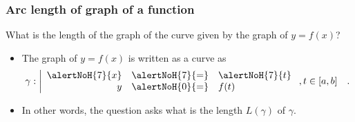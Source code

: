 
\begin{frame}
\frametitle{Arc length of graph of a function}
\begin{question}
What is the length of the graph of the curve given by the graph of $y=f(x)$?
\end{question}
\begin{itemize}
\item<2-> The graph of $y=f(x)$ is written as a curve as 
\[
\gamma:\left|
\begin{array}{rcl}
\alertNoH{7}{x}&\alertNoH{7}{=}&\alertNoH{7}{t}\\
y&\alertNoH{0}{=}&f(t) 
\end{array}\right.,t\in [a,b]\quad .
\]
\item<3-> In other words, the question asks what is the length $L(\gamma)$ of $\gamma$. 
\end{itemize}

\end{frame}

